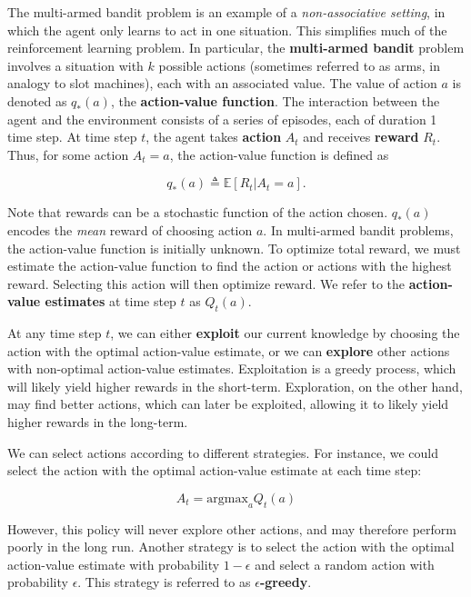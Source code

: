 The multi-armed bandit problem is an example of a \textit{non-associative setting}, in which the agent only learns to act in one situation. This simplifies much of the reinforcement learning problem. In particular, the \textbf{multi-armed bandit} problem involves a situation with $k$ possible actions (sometimes referred to as arms, in analogy to slot machines), each with an associated value. The value of action $a$ is denoted as $q_* (a)$, the \textbf{action-value function}. The interaction between the agent and the environment consists of a series of episodes, each of duration 1 time step. At time step $t$, the agent takes \textbf{action} $A_t$ and receives \textbf{reward} $R_t$. Thus, for some action $A_t = a$, the action-value function is defined as

\begin{equation}
	q_* (a) \triangleq \mathbb{E} \left[ R_t | A_t = a \right].
\end{equation}

\noindent Note that rewards can be a stochastic function of the action chosen. $q_* (a)$ encodes the \textit{mean} reward of choosing action $a$. In multi-armed bandit problems, the action-value function is initially unknown. To optimize total reward, we must estimate the action-value function to find the action or actions with the highest reward. Selecting this action will then optimize reward. We refer to the \textbf{action-value estimates} at time step $t$ as $Q_t (a)$.

At any time step $t$, we can either \textbf{exploit} our current knowledge by choosing the action with the optimal action-value estimate, or we can \textbf{explore} other actions with non-optimal action-value estimates. Exploitation is a greedy process, which will likely yield higher rewards in the short-term. Exploration, on the other hand, may find better actions, which can later be exploited, allowing it to likely yield higher rewards in the long-term.

We can select actions according to different strategies. For instance, we could select the action with the optimal action-value estimate at each time step:

\begin{equation}
A_t = \text{argmax}_a Q_t (a)
\end{equation}

\noindent However, this policy will never explore other actions, and may therefore perform poorly in the long run. Another strategy is to select the action with the optimal action-value estimate with probability $1 - \epsilon$ and select a random action with probability $\epsilon$. This strategy is referred to as $\epsilon$\textbf{-greedy}.

